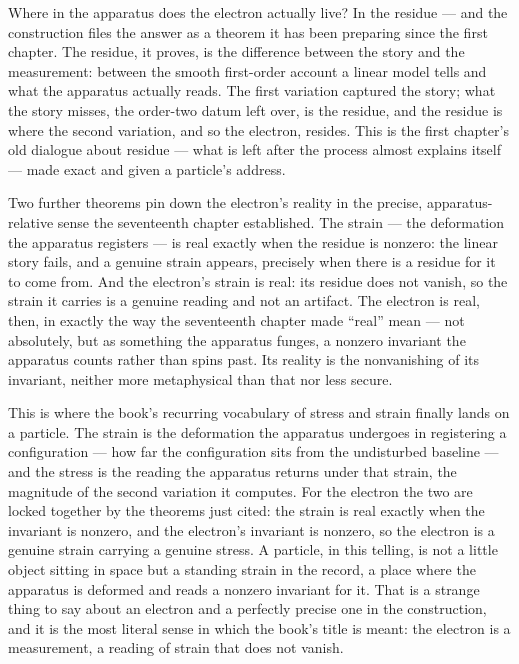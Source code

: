 Where in the apparatus does the electron actually live? In the residue --- and the construction files
the answer as a theorem it has been preparing since the first chapter. The residue, it proves, is the
difference between the story and the measurement: between the smooth first-order account a linear model
tells and what the apparatus actually reads. The first variation captured the story; what the story
misses, the order-two datum left over, is the residue, and the residue is where the second variation,
and so the electron, resides. This is the first chapter's old dialogue about residue --- what is left
after the process almost explains itself --- made exact and given a particle's address.

Two further theorems pin down the electron's reality in the precise, apparatus-relative sense the
seventeenth chapter established. The strain --- the deformation the apparatus registers --- is real
exactly when the residue is nonzero: the linear story fails, and a genuine strain appears, precisely
when there is a residue for it to come from. And the electron's strain is real: its residue does not
vanish, so the strain it carries is a genuine reading and not an artifact. The electron is real, then,
in exactly the way the seventeenth chapter made ``real'' mean --- not absolutely, but as something the
apparatus funges, a nonzero invariant the apparatus counts rather than spins past. Its reality is the
nonvanishing of its invariant, neither more metaphysical than that nor less secure.

This is where the book's recurring vocabulary of stress and strain finally lands on a particle. The
strain is the deformation the apparatus undergoes in registering a configuration --- how far the
configuration sits from the undisturbed baseline --- and the stress is the reading the apparatus returns
under that strain, the magnitude of the second variation it computes. For the electron the two are
locked together by the theorems just cited: the strain is real exactly when the invariant is nonzero,
and the electron's invariant is nonzero, so the electron is a genuine strain carrying a genuine stress.
A particle, in this telling, is not a little object sitting in space but a standing strain in the
record, a place where the apparatus is deformed and reads a nonzero invariant for it. That is a strange
thing to say about an electron and a perfectly precise one in the construction, and it is the most
literal sense in which the book's title is meant: the electron is a measurement, a reading of strain
that does not vanish.

